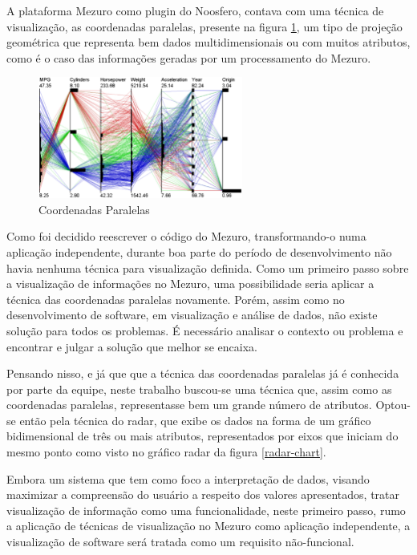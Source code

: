 A plataforma Mezuro como plugin do Noosfero, contava com uma técnica de visualização, as coordenadas paralelas, presente na figura \ref{parallel-coordinate}, um tipo de projeção geométrica que representa bem dados multidimensionais ou com muitos atributos, como é o caso das informações geradas por um processamento do Mezuro.

\graphicspath{{figuras/}}
\begin{figure}[h]
\centering
\includegraphics[width=0.6\textwidth]{parallel_coordinate}
\caption{Coordenadas Paralelas \cite{mcdonnell2008illustrative}}
\label{parallel-coordinate}
\end{figure}

Como foi decidido reescrever o código do Mezuro, transformando-o numa aplicação independente, durante boa parte do período de desenvolvimento não havia nenhuma técnica para visualização definida. Como um primeiro passo sobre a visualização de informações no Mezuro, uma possibilidade seria aplicar a técnica das coordenadas paralelas novamente. Porém, assim como no desenvolvimento de software, em visualização e análise de dados, não existe solução para todos os problemas. É necessário analisar o contexto ou problema e encontrar e julgar a solução que melhor se encaixa.

Pensando nisso, e já que que a técnica das coordenadas paralelas já é conhecida por parte da equipe, neste trabalho buscou-se uma técnica que, assim como as coordenadas paralelas, representasse bem um grande número de atributos. Optou-se então pela técnica do radar, que exibe os dados na forma de um gráfico bidimensional de três ou mais atributos, representados por eixos que iniciam do mesmo ponto como visto no gráfico radar da figura \ref{radar-chart}.

Embora um sistema que tem como foco a interpretação de dados, visando maximizar a compreensão do usuário a respeito dos valores apresentados, tratar visualização de informação como uma funcionalidade, neste primeiro passo, rumo a aplicação de técnicas de visualização no Mezuro como aplicação independente, a visualização de software será tratada como um requisito não-funcional. 

